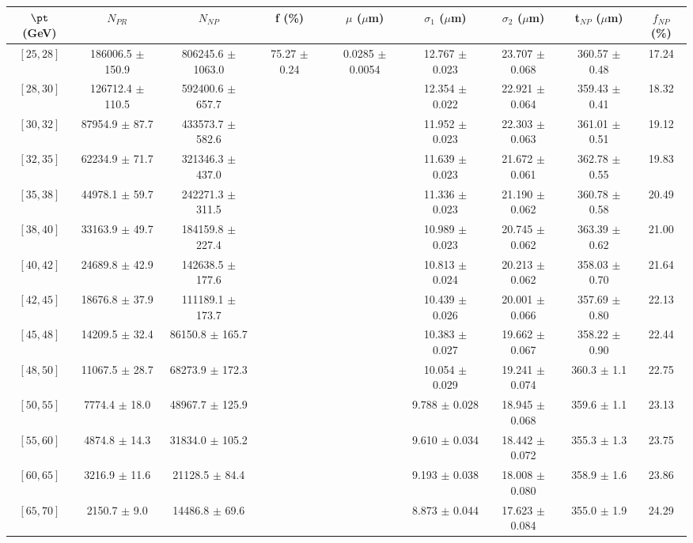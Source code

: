 \begin{tabular}{c||c|c|c|c|c|c|c||c}
$\pt$ (GeV) & $N_{PR}$ & $N_{NP}$ & f (\%) & $\mu$ ($\mu$m) & $\sigma_1$ ($\mu$m) & $\sigma_2$ ($\mu$m)  & t$_{NP}$ ($\mu$m) & $f_{NP}$ (\%) \\
\hline
$[25, 28]$ & 186006.5 $\pm$ 150.9 & 806245.6 $\pm$ 1063.0 & \multirow{19}{*}{75.27 $\pm$ 0.24} & \multirow{19}{*}{0.0285 $\pm$ 0.0054} & 12.767 $\pm$ 0.023 & 23.707 $\pm$ 0.068 & 360.57 $\pm$ 0.48 & 17.24\\
$[28, 30]$ & 126712.4 $\pm$ 110.5 & 592400.6 $\pm$ 657.7 &  &  & 12.354 $\pm$ 0.022 & 22.921 $\pm$ 0.064 & 359.43 $\pm$ 0.41 & 18.32\\
$[30, 32]$ & 87954.9 $\pm$ 87.7 & 433573.7 $\pm$ 582.6 &  &  & 11.952 $\pm$ 0.023 & 22.303 $\pm$ 0.063 & 361.01 $\pm$ 0.51 & 19.12\\
$[32, 35]$ & 62234.9 $\pm$ 71.7 & 321346.3 $\pm$ 437.0 &  &  & 11.639 $\pm$ 0.023 & 21.672 $\pm$ 0.061 & 362.78 $\pm$ 0.55 & 19.83\\
$[35, 38]$ & 44978.1 $\pm$ 59.7 & 242271.3 $\pm$ 311.5 &  &  & 11.336 $\pm$ 0.023 & 21.190 $\pm$ 0.062 & 360.78 $\pm$ 0.58 & 20.49\\
$[38, 40]$ & 33163.9 $\pm$ 49.7 & 184159.8 $\pm$ 227.4 &  &  & 10.989 $\pm$ 0.023 & 20.745 $\pm$ 0.062 & 363.39 $\pm$ 0.62 & 21.00\\
$[40, 42]$ & 24689.8 $\pm$ 42.9 & 142638.5 $\pm$ 177.6 &  &  & 10.813 $\pm$ 0.024 & 20.213 $\pm$ 0.062 & 358.03 $\pm$ 0.70 & 21.64\\
$[42, 45]$ & 18676.8 $\pm$ 37.9 & 111189.1 $\pm$ 173.7 &  &  & 10.439 $\pm$ 0.026 & 20.001 $\pm$ 0.066 & 357.69 $\pm$ 0.80 & 22.13\\
$[45, 48]$ & 14209.5 $\pm$ 32.4 & 86150.8 $\pm$ 165.7 &  &  & 10.383 $\pm$ 0.027 & 19.662 $\pm$ 0.067 & 358.22 $\pm$ 0.90 & 22.44\\
$[48, 50]$ & 11067.5 $\pm$ 28.7 & 68273.9 $\pm$ 172.3 &  &  & 10.054 $\pm$ 0.029 & 19.241 $\pm$ 0.074 & 360.3 $\pm$ 1.1 & 22.75\\
$[50, 55]$ & 7774.4 $\pm$ 18.0 & 48967.7 $\pm$ 125.9 &  &  & 9.788 $\pm$ 0.028 & 18.945 $\pm$ 0.068 & 359.6 $\pm$ 1.1 & 23.13\\
$[55, 60]$ & 4874.8 $\pm$ 14.3 & 31834.0 $\pm$ 105.2 &  &  & 9.610 $\pm$ 0.034 & 18.442 $\pm$ 0.072 & 355.3 $\pm$ 1.3 & 23.75\\
$[60, 65]$ & 3216.9 $\pm$ 11.6 & 21128.5 $\pm$ 84.4 &  &  & 9.193 $\pm$ 0.038 & 18.008 $\pm$ 0.080 & 358.9 $\pm$ 1.6 & 23.86\\
$[65, 70]$ & 2150.7 $\pm$ 9.0 & 14486.8 $\pm$ 69.6 &  &  & 8.873 $\pm$ 0.044 & 17.623 $\pm$ 0.084 & 355.0 $\pm$ 1.9 & 24.29\\

\end{tabular}
